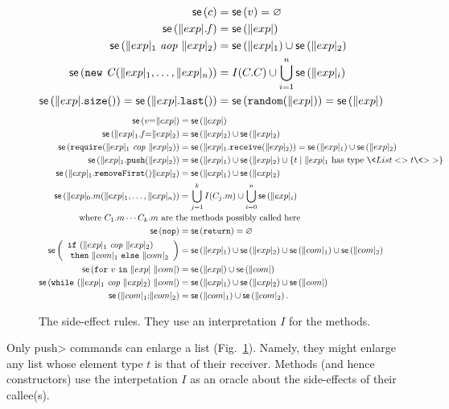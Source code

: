 %
\begin{figure}[th]
  \begin{align*}
    \sideeffect{c}&=\sideeffect{v}=\varnothing\\
    \sideeffect{\field{\exp}{f}}&=\sideeffect{\exp}\\
    \sideeffect{\aop{\exp_1}{\exp_2}}&=\sideeffect{\exp_1}\cup\sideeffect{\exp_2}\\
    \sideeffect{\new{C}{\exp_1,\ldots,\exp_n}}&=I(C.C)\cup\bigcup_{i=1}^n\sideeffect{\exp_i}\\
    \sideeffect{\size{\exp}}=\sideeffect{\last{\exp}}&=\sideeffect{\random{\exp}}=\sideeffect{\exp}
  \end{align*}
  \begin{align*}
    \sideeffect{\assign{v}{\exp}}&=\sideeffect{\exp}\\
    \sideeffect{\assign{\field{\exp_1}{f}}{\exp_2}}&=\sideeffect{\exp_2}\cup\sideeffect{\exp_2}\\
    \sideeffect{\require{\exp_1}{\exp_2}}&=\sideeffect{\receive{\exp_1}{\exp_2}}=\sideeffect{\exp_1}\cup\sideeffect{\exp_2}\\
    \sideeffect{\push{\exp_1}{\exp_2}}&=\sideeffect{\exp_1}\cup\sideeffect{\exp_2}\cup
    \{t\mid\exp_1\text{ has type }\<List<>t\<\text{>}>\}\\
    \sideeffect{\removeFirst{\exp_1}{\exp_2}}&=\sideeffect{\exp_1}\cup\sideeffect{\exp_2}\\
    \sideeffect{\call{\exp_0}{m}{\exp_1,\ldots,\exp_n}}&=\bigcup_{j=1}^k I(C_j.m)\cup\bigcup_{i=0}^n\sideeffect{\exp_i}\\
    \noalign{\centering\text{where $C_1.m\cdots C_k.m$ are the methods possibly called here}}
    \sideeffect{\nop}&=\sideeffect{\return}=\varnothing\\
    \sideeffect{\ifetwo{\exp_1}{\exp_2}{\com_1}{\com_2}}&=\sideeffect{\exp_1}\cup\sideeffect{\exp_2}\cup\sideeffect{\com_1}\cup\sideeffect{\com_2}\\
    \sideeffect{\for{v}{\exp}{\com}}&=\sideeffect{\exp}\cup\sideeffect{\com}\\
    \sideeffect{\while{\exp_1}{\exp_2}{\com}}&=\sideeffect{\exp_1}\cup\sideeffect{\exp_2}\cup\sideeffect{\com}\\
    \sideeffect{\sequence{\com_1}{\com_2}}&=\sideeffect{\com_1}\cup\sideeffect{\com_2}.
  \end{align*}
  \caption{The side-effect rules. They use an interpretation $I$ for the methods.}
  \label{fig:side_effect_full}
\end{figure}
%
Only \<push> commands can enlarge a list (Fig.~\ref{fig:side_effect_full}).
Namely, they might enlarge any list whose element type $t$ is that of their receiver.
Methods (and hence constructors) use the interpetation $I$ as an oracle
about the side-effects of their callee(s).

